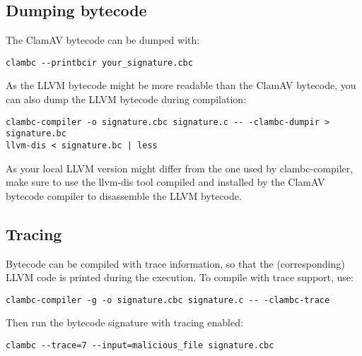 \subsection{Dumping bytecode}
The ClamAV bytecode can be dumped with:
\begin{verbatim}
clambc --printbcir your_signature.cbc 
\end{verbatim}

As the LLVM bytecode might be more readable than the ClamAV bytecode, you can
also dump the LLVM bytecode during compilation:
\begin{verbatim}
clambc-compiler -o signature.cbc signature.c -- -clambc-dumpir > signature.bc
llvm-dis < signature.bc | less
\end{verbatim}

As your local LLVM version might differ from the one used by clambc-compiler,
make sure to use the llvm-dis tool compiled and installed by the ClamAV
bytecode compiler to disassemble the LLVM bytecode.

\subsection{Tracing}
Bytecode can be compiled with trace information, so that the (corresponding)
LLVM code is printed during the execution. To compile with trace support, use:
\begin{verbatim}
clambc-compiler -g -o signature.cbc signature.c -- -clambc-trace
\end{verbatim}

Then run the bytecode signature with tracing enabled:
\begin{verbatim}
clambc --trace=7 --input=malicious_file signature.cbc
\end{verbatim}
